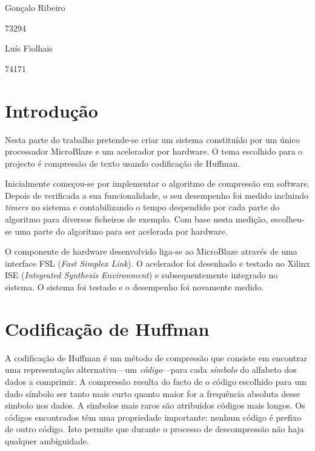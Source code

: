 \documentclass[a4paper]{article}
\begin{document}
	
	
	
	\trSetAuthors
		{
		\begin{center}
		Gonçalo Ribeiro
		
		73294
		\end{center}
		}{
		\begin{center}
		Luís Fiolhais
		
		74171
		\end{center}
		}

	
	\trMakeCover
	
	\tableofcontents
	\pagebreak
	
	\section{Introdução}
	
	Nesta parte do trabalho pretende-se criar um sistema constituído por um único processador MicroBlaze e um acelerador por hardware. O tema escolhido para o projecto é compressão de texto usando codificação de Huffman.
	
	Inicialmente começou-se por implementar o algoritmo de compressão em software. Depois de verificada a sua funcionalidade, o seu desempenho foi medido incluindo \textit{timers} no sistema e contabilizando o tempo despendido por cada parte do algoritmo para diversos ficheiros de exemplo. Com base nesta medição, escolheu-se uma parte do algoritmo para ser acelerada por hardware.
	
	O componente de hardware desenvolvido liga-se ao MicroBlaze através de uma interface FSL (\textit{Fast Simplex Link}). O acelerador foi desenhado e testado no Xilinx ISE (\textit{Integrated Synthesis Environment}) e subsequentemente integrado no sistema. O sistema foi testado e o desempenho foi novamente medido.
	
	
	
	\section{Codificação de Huffman}
	\label{sec:theory}

	A codificação de Huffman é um método de compressão que consiste em encontrar uma representação alternativa---um \emph{código}---para cada \emph{símbolo} do alfabeto dos dados a comprimir. A compressão resulta do facto de o código escolhido para um dado símbolo ser tanto mais curto quanto maior for a frequência absoluta desse símbolo nos dados. A símbolos mais raros são atribuídos códigos mais longos. Os códigos encontrados têm uma propriedade importante: nenhum código é prefixo de outro código. Isto permite que durante o processo de descompressão não haja qualquer ambiguidade.
	
\end{document}
